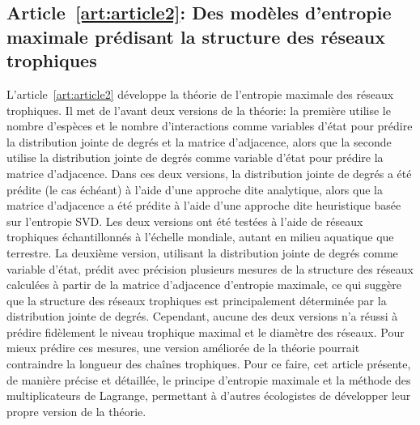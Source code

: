\subsection{Article~\ref{art:article2}: Des modèles d'entropie maximale prédisant la structure des réseaux trophiques} 

L'article~\ref{art:article2} développe la théorie de l'entropie maximale des
réseaux trophiques. Il met de l'avant deux versions de la théorie: la première
utilise le nombre d'espèces et le nombre d'interactions comme variables d'état
pour prédire la distribution jointe de degrés et la matrice d'adjacence, alors
que la seconde utilise la distribution jointe de degrés comme variable d'état
pour prédire la matrice d'adjacence. Dans ces deux versions, la distribution
jointe de degrés a été prédite (le cas échéant) à l'aide d'une approche dite
analytique, alors que la matrice d'adjacence a été prédite à l'aide d'une
approche dite heuristique basée sur l'entropie SVD. Les deux versions ont été
testées à l'aide de réseaux trophiques échantillonnés à l'échelle mondiale,
autant en milieu aquatique que terrestre. La deuxième version, utilisant la
distribution jointe de degrés comme variable d'état, prédit avec précision
plusieurs mesures de la structure des réseaux calculées à partir de la matrice
d'adjacence d'entropie maximale, ce qui suggère que la structure des réseaux
trophiques est principalement déterminée par la distribution jointe de degrés.
Cependant, aucune des deux versions n'a réussi à prédire fidèlement le niveau
trophique maximal et le diamètre des réseaux. Pour mieux prédire ces mesures,
une version améliorée de la théorie pourrait contraindre la longueur des chaînes
trophiques. Pour ce faire, cet article présente, de manière précise et
détaillée, le principe d'entropie maximale et la méthode des multiplicateurs de
Lagrange, permettant à d'autres écologistes de développer leur propre version de
la théorie.

\endinput
 